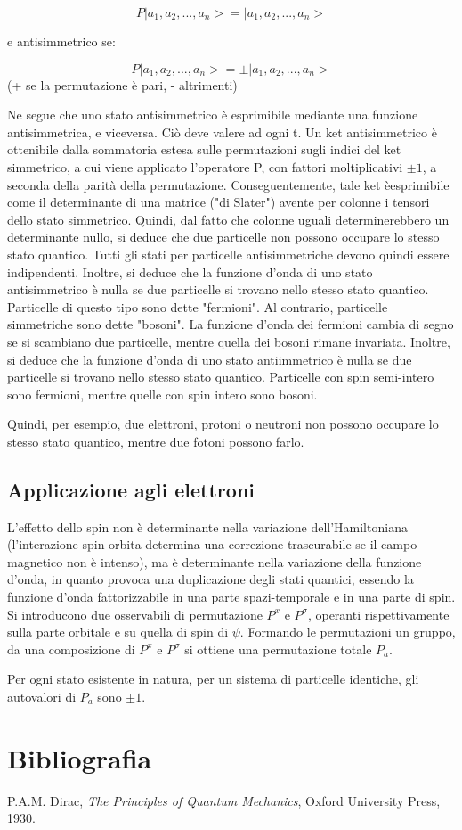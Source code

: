 \documentclass{article}
\begin{document}
\begin{equation}
    P|a_1,a_2,...,a_n>=|a_1,a_2,...,a_n>
\end{equation}

e antisimmetrico se:

\begin{equation}
    P|a_1,a_2,...,a_n>=\pm|a_1,a_2,...,a_n>
\end{equation}
(+ se la permutazione è pari, - altrimenti)

Ne segue che uno stato antisimmetrico è esprimibile mediante una funzione antisimmetrica, e viceversa.
Ciò deve valere ad ogni t.
Un ket antisimmetrico è ottenibile dalla sommatoria estesa sulle permutazioni sugli indici del ket simmetrico, a cui viene applicato l'operatore P, con fattori moltiplicativi $\pm 1$, a
seconda della parità della permutazione.
Conseguentemente, tale ket èesprimibile come il determinante di una matrice ("di Slater") avente per colonne i tensori dello stato simmetrico.
Quindi, dal fatto che colonne uguali determinerebbero un determinante nullo, si deduce che due particelle non possono occupare lo stesso stato quantico.
Tutti gli stati per particelle antisimmetriche devono quindi essere indipendenti.
Inoltre, si deduce che la funzione d'onda di uno stato antisimmetrico è nulla se due particelle si trovano nello stesso stato quantico.
Particelle di questo tipo sono dette "fermioni".
Al contrario, particelle simmetriche sono dette "bosoni".
La funzione d'onda dei fermioni cambia di segno se si scambiano due particelle, mentre quella dei bosoni rimane invariata.
Inoltre, si deduce che la funzione d'onda di uno stato antiimmetrico è nulla se due particelle si trovano nello stesso stato quantico.
Particelle con spin semi-intero sono fermioni, mentre quelle con spin intero sono bosoni.

Quindi, per esempio, due elettroni, protoni o neutroni non possono occupare lo stesso stato quantico, mentre due fotoni possono farlo.

\subsection*{Applicazione agli elettroni}
L'effetto dello spin non è determinante nella variazione dell'Hamiltoniana (l'interazione spin-orbita determina una correzione trascurabile se il campo
magnetico non è intenso), ma è determinante nella variazione della funzione d'onda, in quanto provoca una duplicazione degli stati quantici,
essendo la funzione d'onda fattorizzabile in una parte spazi-temporale e in una parte di spin.
Si introducono due osservabili di permutazione $P^x$ e $P^\sigma$, operanti rispettivamente sulla parte orbitale e su quella di spin di $\psi$.
Formando le permutazioni un gruppo, da una composizione di $P^x$ e $P^\sigma$ si ottiene una permutazione totale $P_a$.

Per ogni stato esistente in natura, per un sistema di particelle identiche, gli autovalori di $P_a$ sono $\pm 1$.




\section{Bibliografia}
\begin{thebibliography}{9}
     P.A.M. Dirac, \emph{The Principles of Quantum Mechanics}, Oxford University Press, 1930.
\end{thebibliography}
\end{document}
